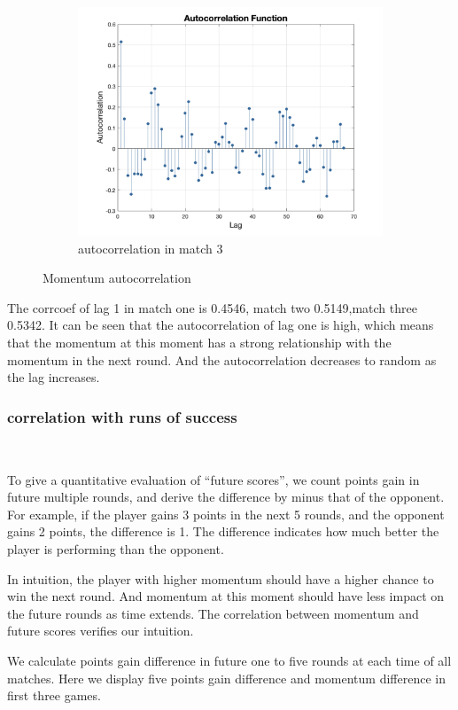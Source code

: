\begin{figure}[H]
\begin{subfigure}[b]{0.34\textwidth}
        \includegraphics[width=\linewidth]{mainmatter/imgs/momen_selfco_3.png}
        \caption{autocorrelation in match 3}
    \end{subfigure}
    \caption{Momentum autocorrelation}
    \label{fig:Correlation}
\end{figure}

The corrcoef of lag 1 in match one is 0.4546, match two 0.5149,match three 0.5342.
It can be seen that the autocorrelation of lag one is high, which means that the momentum at this moment
has a strong relationship with the momentum in the next round. And the autocorrelation decreases to random 
as the lag increases.

\subsubsection{correlation with runs of success}~{}

To give a quantitative evaluation of ``future scores'', we count points gain in future multiple rounds,
and derive the difference by minus that of the opponent. 
For example, if the player gains 3 points in the next 5 rounds, and the opponent gains 2 points,
the difference is 1.
The difference indicates how much better the player is performing than the opponent.

In intuition, the player with higher momentum should have a higher chance to win the next round.
And momentum at this moment should have less impact on the future rounds as time extends.
The correlation between momentum and future scores verifies our intuition.

We calculate points gain difference in future one to five rounds at each time of all matches.
Here we display five points gain difference and momentum difference in first three games.

